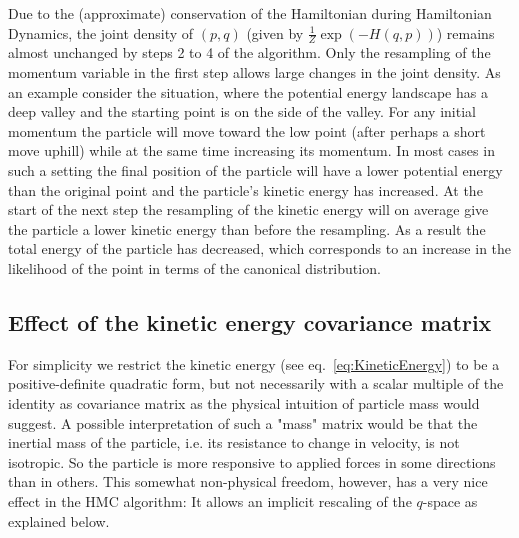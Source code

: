 \documentclass[12pt]{scrartcl}
\begin{document}
Due to the (approximate) conservation of the Hamiltonian during Hamiltonian Dynamics, the joint density of $(p,q)$ (given by $\frac{1}{Z} \exp \left( -H(q, p) \right)$) remains almost unchanged by steps 2 to 4 of the algorithm. Only the resampling of the momentum variable in the first step allows large changes in the joint density. As an example consider the situation, where the potential energy landscape has a deep valley and the starting point is on the side of the valley. For any initial momentum the particle will move toward the low point (after perhaps a short move uphill) while at the same time increasing its momentum. In most cases in such a setting the final position of the particle will have a lower potential energy than the original point and the particle's kinetic energy has increased. At the start of the next step the resampling of the kinetic energy will on average give the particle a lower kinetic energy than before the resampling. As a result the total energy of the particle has decreased, which corresponds to an increase in the likelihood of the point in terms of the canonical distribution.

\subsection{Effect of the kinetic energy covariance matrix}
\label{sec:EffectOfKineticEnergyChoice}

For simplicity we restrict the kinetic energy (see eq.~\eqref{eq:KineticEnergy}) to be a positive-definite quadratic form, but not necessarily with a scalar multiple of the identity as covariance matrix as the physical intuition of particle mass would suggest. A possible interpretation of such a "mass" matrix would be that the inertial mass of the particle, i.e. its resistance to change in velocity, is not isotropic. So the particle is more responsive to applied forces in some directions than in others. This somewhat non-physical freedom, however, has a very nice effect in the HMC algorithm: It allows an implicit rescaling of the $q$-space as explained below.
\end{document}
